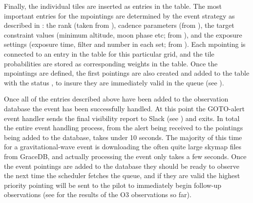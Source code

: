 \begin{colsection}
Finally, the individual tiles are inserted as entries in the  table. The most important entries for the mpointings are determined by the event strategy as described in : the rank (taken from ), cadence parameters (from ), the target constraint values (minimum altitude, moon phase etc; from ), and the exposure settings (exposure time, filter and number in each set; from ). Each mpointing is connected to an entry in the  table for this particular grid, and the tile probabilities are stored as corresponding weights in the  table. Once the mpointings are defined, the first pointings are also created and added to the  table with the status , to insure they are immediately valid in the queue (see ).

Once all of the entries described above have been added to the observation database the event has been successfully handled. At this point the GOTO-alert event handler sends the final visibility report to Slack (see ) and exits. In total the entire event handling process, from the alert being received to the pointings being added to the database, takes under 10 seconds. The majority of this time for a gravitational-wave event is downloading the often quite large skymap files from GraceDB, and actually processing the event only takes a few seconds. Once the event pointings are added to the database they should be ready to observe the next time the scheduler fetches the queue, and if they are valid the highest priority pointing will be sent to the pilot to immediately begin follow-up observations (see  for the results of the O3 observations so far).

\end{colsection}

